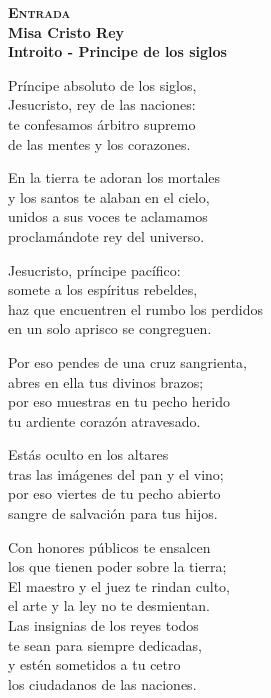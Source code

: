 \documentclass[letterpaper]{report}
\begin{document}
    \begin{center}
        {\scshape \Huge {\bfseries Entrada}} \\
        {\LARGE {\bfseries Misa Cristo Rey}} \\
        {\Large {\bfseries Introito - Principe de los siglos}}
    \end{center}
    
    \LARGE Pr\'incipe absoluto de los siglos,\\
    Jesucristo, rey de las naciones:\\
    te confesamos \'arbitro supremo\\
    de las mentes y los corazones.
    
    En la tierra te adoran los mortales\\
    y los santos te alaban en el cielo,\\
    unidos a sus voces te aclamamos\\
    proclam\'andote rey del universo.
    
    Jesucristo, pr\'incipe pac\'ifico:\\
    somete a los esp\'iritus rebeldes,\\
    haz que encuentren el rumbo los perdidos\\
    en un solo aprisco se congreguen.
    
    Por eso pendes de una cruz sangrienta,\\
    abres en ella tus divinos brazos;\\
    por eso muestras en tu pecho herido\\
    tu ardiente coraz\'on atravesado.
    
    Est\'as oculto en los altares\\
    tras las im\'agenes del pan y el vino;\\
    por eso viertes de tu pecho abierto\\
    sangre de salvaci\'on para tus hijos.
    
    Con honores p\'ublicos te ensalcen\\
    los que tienen poder sobre la tierra;\\
    El maestro y el juez te rindan  culto,\\
    el arte y la ley no te desmientan.\\
  
    Las insignias de los reyes todos\\
    te sean para siempre dedicadas,\\
    y est\'en sometidos a tu cetro\\
    los ciudadanos de las naciones.
  
\end{document}
